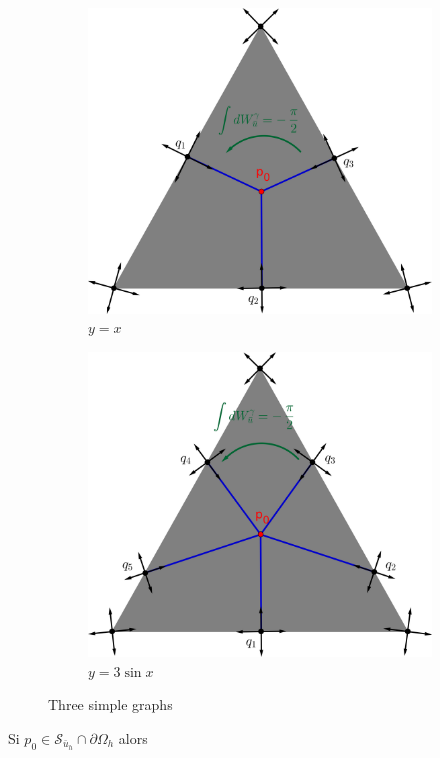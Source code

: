 \begin{itemize}
\begin{figure}[!h]
     \centering
     \begin{subfigure}[b]{0.49\textwidth}
         \centering
         \includegraphics[width=\textwidth]{images/triangle separatrices 3.png}
         \caption{$y=x$}
         \label{fig:y equals x}
     \end{subfigure}
     \hfill
     \begin{subfigure}[b]{0.49\textwidth}
         \centering
         \includegraphics[width=\textwidth]{images/triangle separatrices 5.png}
         \caption{$y=3\sin x$}
         \label{fig:three sin x}
     \end{subfigure}
        \caption{Three simple graphs}
        \label{fig:init_streams}
\end{figure}

\end{itemize}
Si $p_0\in\mathcal{S}_{\bar{u}_h}\cap\partial\Omega_h$ alors

